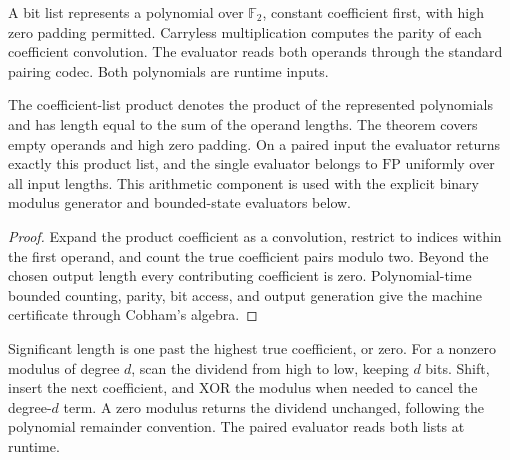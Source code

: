 \begin{definition}
  \label{def:lowerbounds-algebraic-bit-polynomial}
  \leanok
  A bit list represents a polynomial over $\mathbb F_2$, constant
  coefficient first, with high zero padding permitted. Carryless
  multiplication computes the parity of each coefficient convolution.
  The evaluator reads both operands through the standard pairing codec.
  Both polynomials are runtime inputs.
\end{definition}

\begin{theorem}
  \label{thm:lowerbounds-algebraic-bit-polynomial}
  \leanok
  The coefficient-list product denotes the product of the represented
  polynomials and has length equal to the sum of the operand lengths.
  The theorem covers empty operands and high zero padding. On a paired
  input the evaluator returns exactly this product list, and the single
  evaluator belongs to $\mathrm{FP}$ uniformly over all input lengths.
  This arithmetic component is used with the explicit binary modulus
  generator and bounded-state evaluators below.
\end{theorem}
\begin{proof}
  \leanok
  Expand the product coefficient as a convolution, restrict to indices
  within the first operand, and count the true coefficient pairs modulo
  two. Beyond the chosen output length every contributing coefficient is
  zero. Polynomial-time bounded counting, parity, bit access, and output
  generation give the machine certificate through Cobham's algebra.
\end{proof}

\begin{definition}
  \label{def:lowerbounds-algebraic-bit-remainder}
  \leanok
  Significant length is one past the highest true coefficient, or zero.
  For a nonzero modulus of degree $d$, scan the dividend from high to
  low, keeping $d$ bits. Shift, insert the next coefficient, and XOR
  the modulus when needed to cancel the degree-$d$ term. A zero modulus
  returns the dividend unchanged, following the polynomial remainder
  convention. The paired evaluator reads both lists at runtime.
\end{definition}

